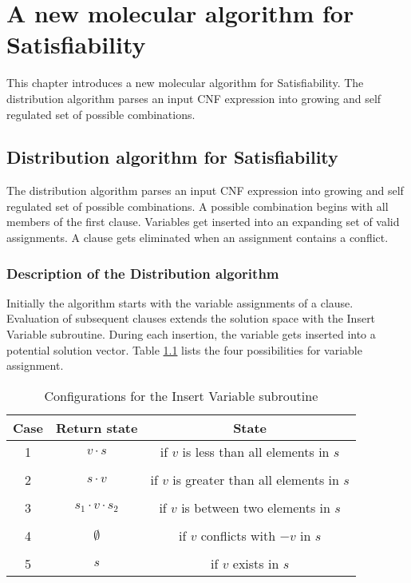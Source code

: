 
\chapter{A new molecular algorithm for {\sc Satisfiability}}

This chapter introduces a new molecular algorithm for {\sc Satisfiability}.  The distribution algorithm parses an input CNF expression into growing and self regulated set of possible combinations.
\section{Distribution algorithm for {\sc Satisfiability}}

The distribution algorithm parses an input CNF expression into growing and self regulated set of possible combinations.  A possible combination begins with all members of the first clause.  Variables get inserted into an expanding set of valid assignments.  A clause gets eliminated when an assignment contains a conflict.
	\subsection{Description of the Distribution algorithm}
		
		
Initially the algorithm starts with the variable assignments of a clause.  Evaluation of subsequent clauses extends the solution space with the {\sc Insert Variable} subroutine.  During each insertion, the variable gets inserted into a potential solution vector.  Table \ref{distributionInsertTable} lists the four possibilities for variable assignment.

\begin{table}[htdp]
\caption{Configurations for the {\sc Insert Variable} subroutine}
\begin{center}
\begin{tabular}{|c|c|c|}
\hline
Case & Return state & State \\ \hline 
1	& $v \cdot s$ & if $v$ is less than all elements in $s$ \\ 
& &  \\ \hline
2	& $s \cdot v$ & if $v$ is greater than all elements in $s$ \\ 
& &  \\ \hline
3	& $s_1 \cdot v \cdot s_2$ & if $v$ is between two elements in $s$ \\ 
& &  \\ \hline
4	& $\emptyset$ & if $v$ conflicts with $-v$ in $s$\\
& &  \\ \hline
5	& $s$ & if $v$ exists in $s$\\ \hline
\end{tabular}
\end{center}
\label{distributionInsertTable}
\end{table}%

